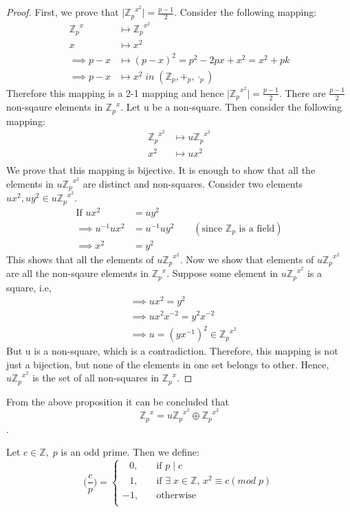 \documentclass[10pt,a4paper]{article}
\begin{document}
\begin{proof}
First, we prove that $\vert {\mathbb{Z}_p}^{x^2}\vert=\frac{p-1}{2}$. Consider the following mapping:
\begin{align*}
{\mathbb{Z}_p}^{x} &\mapsto {\mathbb{Z}_p}^{x^2} \\
x &\mapsto x^2 \\
\implies p-x &\mapsto (p-x)^2 = p^2-2px+x^2 = x^2 + pk \\
\implies p-x &\mapsto x^2\;in\;(\mathbb{Z}_p,+_p,\cdot_p)
\end{align*}
Therefore this mapping is a 2-1 mapping and hence $\vert {\mathbb{Z}_p}^{x^2}\vert=\frac{p-1}{2}$. There are $\frac{p-1}{2}$ non-sqaure elements in ${\mathbb{Z}_p}^x$. Let u be a non-square. Then consider the following mapping:
\begin{align*}
{\mathbb{Z}_p}^{x^2} &\mapsto u{\mathbb{Z}_p}^{x^2} \\
x^2 &\mapsto ux^2 \\
\end{align*}
We prove that this mapping is bijective. It is enough to show that all the elements in $u{\mathbb{Z}_p}^{x^2}$ are distinct and non-squares. Consider two elements $ux^2,uy^2\in u{\mathbb{Z}_p}^{x^2}$.
\begin{align*}
\text{If }ux^2&=uy^2 \\
\implies u^{-1}ux^2&=u^{-1}uy^2 \qquad(\text{since }\mathbb{Z}_p\text{ is a field})\\
\implies x^2&=y^2
\end{align*}
This shows that all the elements of $u{\mathbb{Z}_p}^{x^2}$. Now we show that elements of $u{\mathbb{Z}_p}^{x^2}$ are all the non-sqaure elements in ${\mathbb{Z}_p}^{x}$. Suppose some element in $u{\mathbb{Z}_p}^{x^2}$ is a square, i.e,
\begin{align*}
&\implies ux^2=y^2 \\
&\implies ux^2x^{-2}=y^2x^{-2} \\
&\implies u=(yx^{-1})^2 \in {\mathbb{Z}_p}^{x^2}
\end{align*}
But u is a non-square, which is a contradiction. Therefore, this mapping is not just a bijection, but none of the elements in one set belongs to other. Hence, $u{\mathbb{Z}_p}^{x^2}$ is the set of all non-squares in ${\mathbb{Z}_p}^x$.
\end{proof}

\begin{remark}
From the above proposition it can be concluded that $${\mathbb{Z}_p}^x=u{\mathbb{Z}_p}^{x^2}\oplus {\mathbb{Z}_p}^{x^2}$$.
\end{remark}

\begin{mydef}
Let $c\in\mathbb{Z},\;p$ is an odd prime. Then we define:
\[   
\Big(\frac{c}{p}\Big) = 
     \begin{cases}
       \;\;\,0, &\quad\text{if }p\mid c\\
       \;\;\,1, &\quad\text{if }\exists\;x\in\mathbb{Z},\,x^2\equiv c(mod\;p) \\
      -1, &\quad\text{otherwise}\\ 
     \end{cases}
\]
\end{mydef}
\end{document}
